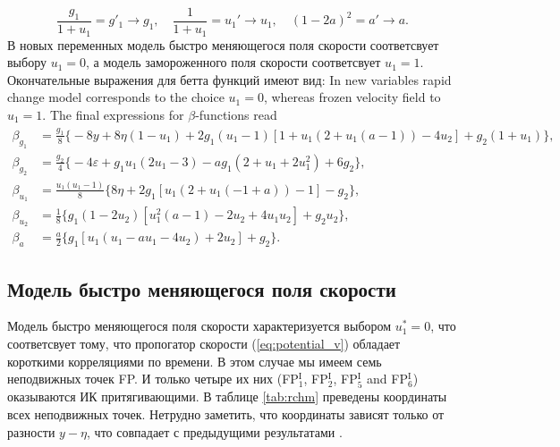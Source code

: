 \documentclass[12pt]{article}
\def\eps{\varepsilon}
\newcommand{\fp}[2]{FP$^{\textrm{#1}}_{#2}$}
\begin{document}
\begin{equation}
  \frac{g_1}{1+u_1} = g'_1 \rightarrow g_1, \quad \frac{1}{1+u_1} = u_1'\rightarrow
  u_1, \quad  (1-2a)^2 = a' \rightarrow a.
  \label{eq:new_charges}
\end{equation}
В новых переменных модель быстро меняющегося поля скорости соответсвует выбору $u_1=0$, а модель замороженного поля скорости соответсвует $u_1=1$.
Окончательные выражения для бетта функций имеют вид:
In new variables rapid change model corresponds to the choice $u_1=0$, whereas
frozen velocity field to $u_1=1$. The final expressions for $\beta$-functions read
\begin{align}
  \beta_{g_1} & =  \frac{g_1}{8} \biggl\{- 8 y + 8 \eta (1 - u_1) + 
                 2 g_1 ( u_1 - 1) [1 + u_1 (2 + u_1(a- 1)) - 4 u_2] + g_2(1+u_1) \biggl\},\nonumber \\
  \beta_{g_2} & = \frac{g_2}{4}  \biggl\{-4 \eps  + g_1 u_1 (2 u_1 - 3) - a g_1 (2 + u_1 + 2 u_1^2) + 6 g_2\biggl\},\nonumber \\
  \beta_{u_1} & = \frac{u_1 (u_1-1)}{8}   \biggl\{8 \eta  + 2 g_1 [u_1 (2 + u_1(-1 + a))-1] -g_2\biggl\},\nonumber \\
  \beta_{u_2} & = \frac{1}{8}  \biggl\{ g_1 (1 - 2 u_2) [u_1^2 (a-1) - 2 u_2 + 4 u_1 u_2] + g_2 u_2\biggl\},\nonumber \\
  \beta_{a} & = \frac{a}{2}  \biggl\{ g_1 [u_1 (u_1 - a u_1 - 4 u_2) + 2 u_2] + g_2\biggl\}.
  \label{eq:final_beta}
\end{align}

{\subsection{Модель быстро меняющегося поля скорости} \label{subsec:rchm}}
Модель быстро меняющегося поля скорости \cite{Ant00} характеризуется выбором $u_1^*=0$, что соответсвует тому, что пропогатор скорости (\ref{eq:potential_v}) обладает короткими корреляциями по времени.
В этом случае мы имеем семь неподвижных точек FP. И только четыре их них (\fp{I}{1}, \fp{I}{2}, \fp{I}{5} and \fp{I}{6}) оказываются ИК притягивающими.
В таблице \ref{tab:rchm} преведены координаты всех неподвижных точек.
Нетрудно заметить, что координаты зависят только от разности $y-\eta$, что совпадает с предыдущими результатами \cite{Ant99,Ant00}.
\end{document}
